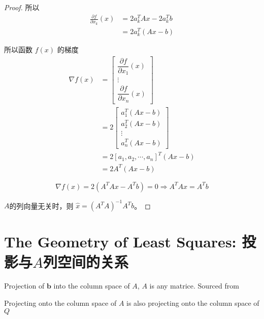 \begin{proof}
    所以
    $$
    \begin{aligned}
        \frac{\partial f}{\partial x_{k}}(x)
        &=2 a_{k}^{T} A x-2 a_{k}^{T} b\\
        &=2 a_{k}^{T}(A x-b)
    \end{aligned}
    $$

    所以函数 $ f(x) $ 的梯度
$$
\begin{aligned}
    \nabla f(x)&=\left[\begin{array}{c}
    \dfrac{\partial f}{\partial x_{1}}(x) \\
    \vdots \\
    \dfrac{\partial f}{\partial x_{n}}(x)
    \end{array}\right]\\
    &=2\left[\begin{array}{c}
    a_{1}^{T}(A x-b) \\
    a_{2}^{T}(A x-b) \\
    \vdots \\
    a_{n}^{T}(A x-b)
    \end{array}\right] \\
    &= 2\left[a_{1}, a_{2}, \cdots, a_{n}\right]^{T}(A x-b) \\
    &=2 A^{T}(A x-b) 
\end{aligned}
$$

$$\nabla f(x)=2\left(A^{T} A x-A^{T} b\right)=0 \Rightarrow A^{T} A x=A^{T} b$$

$A$的列向量无关时，则 $ \hat{x}=\left(A^{T} A\right)^{-1} A^{T} b $。

\end{proof}

\section{The Geometry of Least Squares: 投影与$A$列空间的关系}

\begin{FigureCenter}{Projection of $\boldsymbol{b}$ into the column space of ${A}$, $A$ is any matrice. Sourced from \cite{Strang1993IntroductionTL}}
    
\end{FigureCenter}

\begin{FigureCenter}{Projecting onto the column space of $A$ is also projecting onto the column space of $Q$}
    
\end{FigureCenter}

